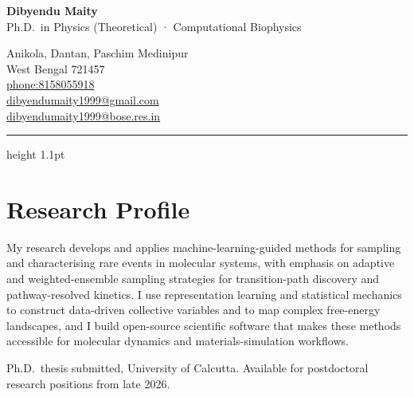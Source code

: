 \documentclass[10pt,a4paper]{article}
\newcommand{\contactsep}{\hspace{0.55em}{\color{rulegrey}\textbullet}\hspace{0.55em}}
\begin{document}
\thispagestyle{fancy}
\RaggedRight

\noindent
\begin{minipage}[t]{0.60\textwidth}
  {\headingfont\fontsize{28}{31}\selectfont\bfseries\color{navy}Dibyendu Maity}\\[3pt]
  {\headingfont\normalsize\color{accent}Ph.D.\ in Physics (Theoretical) · Computational Biophysics}
\end{minipage}%
\hfill
\begin{minipage}[t]{0.36\textwidth}
  \raggedleft\small\color{muted}
  Anikola, Dantan, Paschim Medinipur\\
  West Bengal 721457\\[3pt]
  \href{phone:8158055918}{phone:8158055918}\\
  \href{mailto:dibyendumaity1999@gmail.com}{dibyendumaity1999@gmail.com}\\
  \href{mailto:dibyendumaity1999@bose.res.in}{dibyendumaity1999@bose.res.in}\\
\end{minipage}

\vspace{0.5em}
{\color{accent}\hrule height 1.1pt}
\vspace{0.65em}

\section{Research Profile}

My research develops and applies machine-learning-guided methods for sampling and characterising rare
events in molecular systems, with emphasis on adaptive and weighted-ensemble sampling strategies for
transition-path discovery and pathway-resolved kinetics. I use representation learning and statistical
mechanics to construct data-driven collective variables and to map complex free-energy landscapes,
and I build open-source scientific software that makes these methods accessible for molecular
dynamics and materials-simulation workflows.

Ph.D.\ thesis submitted, University of Calcutta.
Available for postdoctoral research positions from late 2026.
\end{document}
